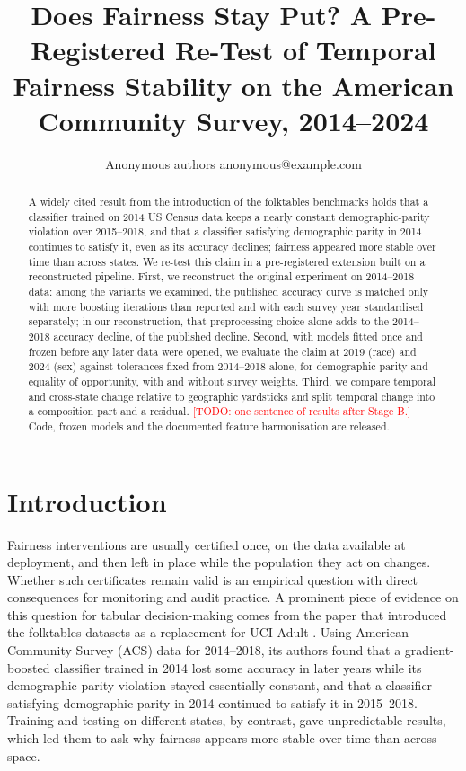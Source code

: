 \documentclass[10pt]{article}
\title{Does Fairness Stay Put? A Pre-Registered Re-Test of Temporal Fairness Stability on the American Community Survey, 2014--2024}
\author{\name Anonymous authors \email anonymous@example.com}
\newcommand{\todo}[1]{\textcolor{red}{[TODO: #1]}}
\begin{document}
\maketitle

\begin{abstract}
A widely cited result from the introduction of the folktables benchmarks holds that a classifier trained on 2014 US Census data keeps a nearly constant demographic-parity violation over 2015--2018, and that a classifier satisfying demographic parity in 2014 continues to satisfy it, even as its accuracy declines; fairness appeared more stable over time than across states.
We re-test this claim in a pre-registered extension built on a reconstructed pipeline. First, we reconstruct the original experiment on 2014--2018 data: among the variants we examined, the published accuracy curve is matched only with more boosting iterations than reported and with each survey year standardised separately; in our reconstruction, that preprocessing choice alone adds \PreprocContrastAcc{} to the 2014--2018 accuracy decline, \PreprocContrastShare{} of the published decline.
Second, with models fitted once and frozen before any later data were opened, we evaluate the claim at 2019 (race) and 2024 (sex) against tolerances fixed from 2014--2018 alone, for demographic parity and equality of opportunity, with and without survey weights.
Third, we compare temporal and cross-state change relative to geographic yardsticks and split temporal change into a composition part and a residual.
\todo{one sentence of results after Stage B.}
Code, frozen models and the documented feature harmonisation are released.
\end{abstract}

\section{Introduction}

Fairness interventions are usually certified once, on the data available at deployment, and then left in place while the population they act on changes.
Whether such certificates remain valid is an empirical question with direct consequences for monitoring and audit practice.
A prominent piece of evidence on this question for tabular decision-making comes from the paper that introduced the folktables datasets as a replacement for UCI Adult \citep{ding2021retiring}.
Using American Community Survey (ACS) data for 2014--2018, its authors found that a gradient-boosted classifier trained in 2014 lost some accuracy in later years while its demographic-parity violation stayed essentially constant, and that a classifier satisfying demographic parity in 2014 continued to satisfy it in 2015--2018.
Training and testing on different states, by contrast, gave unpredictable results, which led them to ask why fairness appears more stable over time than across space.
\end{document}
